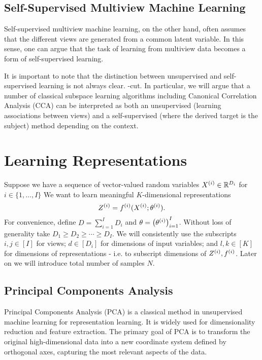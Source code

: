 \subsection{Self-Supervised Multiview Machine Learning}
Self-supervised multiview machine learning, on the other hand, often assumes that the different views are generated from a common latent variable.
In this sense, one can argue that the task of learning from multiview data becomes a form of self-supervised learning.

It is important to note that the distinction between unsupervised and self-supervised learning is not always clear.
-cut.
In particular, we will argue that a number of classical subspace learning algorithms including Canonical Correlation
Analysis (CCA) can be interpreted as both an unsupervised (learning associations between views) and a self-supervised (where the derived target is the subject) method depending on the context.

\section{Learning Representations}

Suppose we have a sequence of vector-valued random variables $X^{(i)} \in \mathbb{R}^{D_i}$ for $i \in \{1, \dots, I \}$
We want to learn meaningful $K$-dimensional representations
\begin{equation}\label{eq:general-form-of-representations}
    Z^{(i)} = f^{(i)}( X^{(i)}; \theta^{(i)}).
\end{equation}
For convenience, define $D = \sum_{i=1}^I D_i$ and $\theta = \left(\theta^{(i)}\right)_{i=1}^I$.
Without loss of generality take $D_1 \geq D_2 \geq \cdots \geq D_I$.
We will consistently use the subscripts $i,j \in [I]$ for views;
$d \in [D_i]$ for dimensions of input variables;
and $l,k \in [K]$ for dimensions of representations - i.e. to subscript dimensions of $Z^{(i)}, f^{(i)}$.
Later on we will introduce total number of samples $N$.

\subsection{Principal Components Analysis}

Principal Components Analysis (PCA)\cite{hotelling1933analysis} is a classical method in unsupervised machine learning for representation learning.
It is widely used for dimensionality reduction and feature extraction. The primary goal of PCA is to transform the original high-dimensional data into a new coordinate system defined by orthogonal axes, capturing the most relevant aspects of the data.

